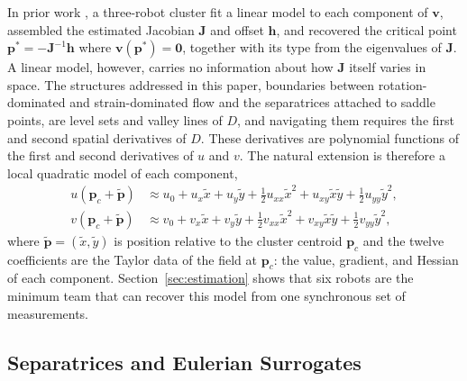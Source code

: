 \documentclass[lettersize,journal]{IEEEtran}
\begin{document}
In prior work \cite{14}, a three-robot cluster fit a linear model to each
component of $\mathbf{v}$, assembled the estimated Jacobian
$\mathbf{J}$ and offset $\mathbf{h}$, and recovered the critical point
$\mathbf{p}^* = -\mathbf{J}^{-1}\mathbf{h}$ where $\mathbf{v}(\mathbf{p}^*) =
\mathbf{0}$, together with its type from the eigenvalues of $\mathbf{J}$.
A linear model, however, carries no information about how $\mathbf{J}$
itself varies in space. The structures addressed in this paper, boundaries
between rotation-dominated and strain-dominated flow and the separatrices
attached to saddle points, are level sets and valley lines of $D$, and
navigating them requires the first and second spatial derivatives of $D$.
These derivatives are polynomial functions of the first and second
derivatives of $u$ and $v$. The natural extension is therefore a local
quadratic model of each component,
\begin{align}
    u(\mathbf{p}_c + \tilde{\mathbf{p}}) &\approx u_0 + u_x \tilde{x}
        + u_y \tilde{y} + \tfrac{1}{2} u_{xx} \tilde{x}^2
        + u_{xy} \tilde{x}\tilde{y} + \tfrac{1}{2} u_{yy} \tilde{y}^2,
        \label{eq:quad_model_u} \\
    v(\mathbf{p}_c + \tilde{\mathbf{p}}) &\approx v_0 + v_x \tilde{x}
        + v_y \tilde{y} + \tfrac{1}{2} v_{xx} \tilde{x}^2
        + v_{xy} \tilde{x}\tilde{y} + \tfrac{1}{2} v_{yy} \tilde{y}^2,
        \label{eq:quad_model_v}
\end{align}
where $\tilde{\mathbf{p}} = (\tilde{x}, \tilde{y})$ is position relative to
the cluster centroid $\mathbf{p}_c$ and the twelve coefficients are the
Taylor data of the field at $\mathbf{p}_c$: the value, gradient, and
Hessian of each component. Section~\ref{sec:estimation} shows that six
robots are the minimum team that can recover this model from one
synchronous set of measurements.

\subsection{Separatrices and Eulerian Surrogates}
\label{sec:separatrix}
\end{document}
